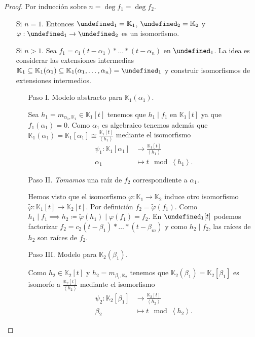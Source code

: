 \documentclass[10pt, spanish]{report}
\theoremstyle{definition}
\newcommand{\K}{\mathbb{K}}
\let\L\undefined
\newcommand{\L}{\mathbb{L}}
\begin{document}
\begin{proof}
    Por inducción sobre $n=\deg{f_1}=\deg{f_2}$.
    \begin{itemize}[itemindent=30pt]
        \item[Si $n=1$.] Entonces $\L_1=\K_1$, $\L_2=\K_2$ y $\varphi:\L_1\to
            \L_2$ es un isomorfismo.
        \item[Si $n>1$.] Sea $f_1=c_1(t-\alpha_1)*\ldots*(t-\alpha_n)$ en
            $\L_1$. La idea es considerar las extensiones intermedias
            $\K_1\subseteq\K_1(\alpha_1)\subseteq\K_1(\alpha_1,\ldots,\alpha_n)=\L_1$
            y construir isomorfismos de extensiones intermedios.
            \begin{enumerate}[itemindent=24pt]
                \item[Paso I.] Modelo abstracto para $\K_1(\alpha_1)$.

                    Sea $h_1=m_{\alpha_1,\K_1}\in\K_1[t]$ tenemos que
                    $h_1\mid f_1$ en $\K_1[t]$ ya que $f_1(\alpha_1)=0$.
                    Como $\alpha_1$ es algebraico tenemos además que
                    $\K_1(\alpha_1)=\K_1[\alpha_1]\cong
                    \frac{\K_1[t]}{\left<h_1\right>}$ mediante el isomorfismo
                    \begin{align*}
                        \psi_1: \K_1[\alpha_1]&\to \frac{\K_1[t]}{\left< h_1
                        \right>}\\
                            \alpha_1&\mapsto t\mod\left<h_1\right>.
                    \end{align*}
                \item[Paso II.] \textit{Tomamos} una raíz de $f_2$
                    correspondiente a $\alpha_1$.

                    Hemos visto que el isomorfismo $\varphi:\K_1\to \K_2$ induce
                    otro isomorfismo $\tilde{\varphi}:\K_1[t]\to\K_2[t]$. Por
                    definición $f_2=\tilde{\varphi}(f_1)$. Como $h_1\mid
                    f_1\implies
                    h_2\coloneqq\tilde{\varphi}(h_1)\mid\varphi(f_1)=f_2$. En
                    $\L_1[t]$ podemos factorizar
                    $f_2=c_2(t-\beta_1)*\ldots*(t-\beta_m)$ y como $h_2\mid
                    f_2$, las raíces de $h_2$ son raíces de $f_2$.
                \item[Paso III.] Modelo para $\K_2(\beta_1)$. 

                    Como $h_2\in\K_2[t]$  y $h_2=m_{\beta_1,\K_2}$ tenemos que
                    $\K_2(\beta_1)=\K_2[\beta_1]$ es isomorfo a
                    $\frac{\K_2[t]}{\left< h_2 \right> }$ mediante el
                    isomorfismo
                    \begin{align*}
                        \psi_2: \K_2[\beta_1]&\to \frac{\K_2[t]}{\left< h_2
                        \right>}\\
                            \beta_2&\mapsto t\mod\left<h_2\right>.
                    \end{align*}


\end{enumerate}
\end{itemize}
\end{proof}
\end{document}
